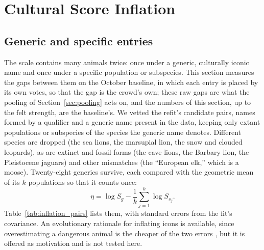 \documentclass[11pt]{article}
\begin{document}
\section{Cultural Score Inflation}
\label{sec:inflation}

\subsection{Generic and specific entries}
The scale contains many animals twice: once under a generic, culturally iconic name and once under a specific population or subspecies. This section measures the gaps between them on the October baseline, in which each entry is placed by its own votes, so that the gap is the crowd's own; these raw gaps are what the pooling of Section~\ref{sec:pooling} acts on, and the numbers of this section, up to the felt strength, are the baseline's. We vetted the refit's candidate pairs, names formed by a qualifier and a generic name present in the data, keeping only extant populations or subspecies of the species the generic name denotes. Different species are dropped (the sea lions, the marsupial lion, the snow and clouded leopards), as are extinct and fossil forms (the cave lions, the Barbary lion, the Pleistocene jaguars) and other mismatches (the ``European elk,'' which is a moose). Twenty-eight generics survive, each compared with the geometric mean of its $k$ populations so that it counts once:
\begin{equation}
\eta=\log S_g-\frac1k\sum_{j=1}^{k}\log S_{s_j} .
\end{equation}
Table~\ref{tab:inflation_pairs} lists them, with standard errors from the fit's covariance. An evolutionary rationale for inflating icons is available, since overestimating a dangerous animal is the cheaper of the two errors \cite{haselton2006paranoid}, but it is offered as motivation and is not tested here.
\end{document}
